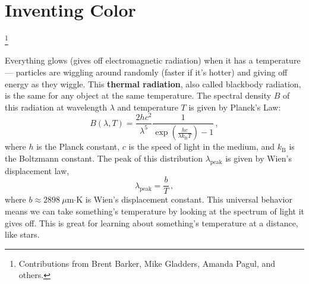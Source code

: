 \chapter{Inventing Color}\footnote{Contributions from Brent Barker, Mike Gladders, Amanda Pagul, and others.}




Everything glows (gives off electromagnetic radiation) when it has a temperature --- particles are wiggling around randomly (faster if it's hotter) and giving off energy as they wiggle. This \textbf{thermal radiation}, also called blackbody radiation, is the same for any object at the same temperature. The spectral density $B$ of this radiation at wavelength $\lambda$ and temperature $T$ is given by Planck's Law:
\begin{equation}\label{ic:eq:planck}
 B(\lambda, T) = \frac{2 h c^2}{\lambda^5}
 \frac{1}{\exp\left( \frac{hc}{\lambda k_\textrm{B} T} \right) - 1} \,,
\end{equation}
where $h$ is the Planck constant, $c$ is the speed of light in the medium, and $k_\textrm{B}$ is the Boltzmann constant. The peak of this distribution $\lambda_\textrm{peak}$ is given by Wien's displacement law,
\begin{equation}\label{ic:eq:wien}
	\lambda_\textrm{peak} = \frac{b}{T} \,,
\end{equation}
where $b \approx 2898\:\mu$m$\cdot$K is Wien's displacement constant. This universal behavior means we can take something's temperature by looking at the spectrum of light it gives off. This is great for learning about something's temperature at a distance, like stars.


